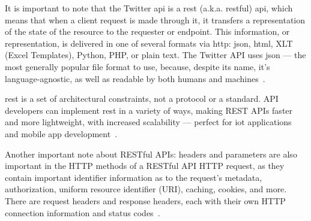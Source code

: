 It is important to note that the Twitter \gls{api} is a \gls{rest}
(a.k.a. \gls{rest}ful) \gls{api}, which means that when a client request is made
through it, it transfers a representation of the state of the resource to the
requester or endpoint. This information, or representation, is delivered in one
of several formats via \gls{http}: \gls{json}, \gls{html}, XLT (Excel
Templates), Python, PHP, or plain text. The Twitter API uses \gls{json} --- the most
generally popular file format to use, because, despite its name, it’s language-agnostic, as well
as readable by both humans and machines~\cite{whatsRestApi}.

\gls{rest} is a set of architectural constraints, not a protocol or a
standard. API developers can implement \gls{rest} in a variety of ways, making
REST APIs faster and more lightweight, with increased scalability --- perfect
for \gls{iot} applications and mobile app development~\cite{whatsRestApi}.

Another important note about RESTful APIs: headers and parameters are also important in the HTTP methods of a RESTful API HTTP request, as they contain important identifier information as to the request's metadata, authorization, uniform resource identifier (URI), caching, cookies, and more. There are request headers and response headers, each with their own HTTP connection information and status codes~\cite{whatsRestApi}.

